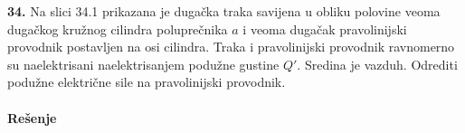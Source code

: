 \textbf{\Large 34.} Na slici 34.1 prikazana je duga\v{c}ka traka savijena u obliku polovine veoma duga\v{c}kog kru\v{z}nog cilindra polupre\v{c}nika $a$ i veoma duga\v{c}ak pravolinijski provodnik postavljen na osi cilindra. Traka i pravolinijski provodnik ravnomerno su naelektrisani naelektrisanjem podu\v{z}ne gustine $Q'$. Sredina je vazduh. Odrediti podu\v{z}ne elektri\v{c}ne sile na pravolinijski provodnik.
\\\\
\textbf{\Large Re\v{s}enje}\\
